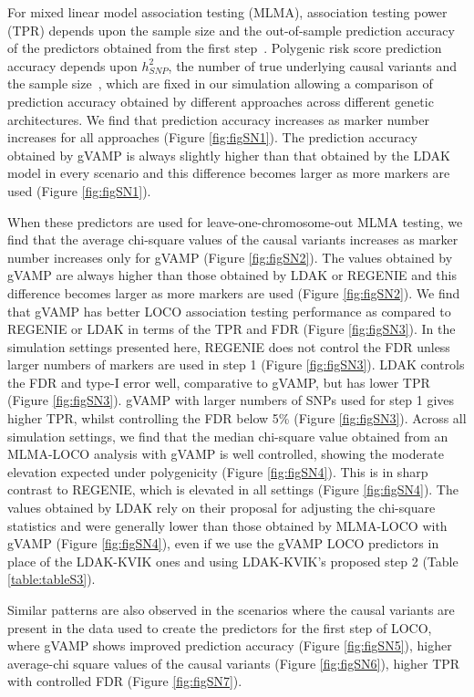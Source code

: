 For mixed linear model association testing (MLMA), association testing power (TPR) depends upon the sample size and the out-of-sample prediction accuracy of the predictors obtained from the first step~\cite{mlma}. Polygenic risk score prediction accuracy depends upon $h^{2}_{SNP}$, the number of true underlying causal variants and the sample size~\cite{daetwyler}, which are fixed in our simulation allowing a comparison of prediction accuracy obtained by different approaches across different genetic architectures. We find that prediction accuracy increases as marker number increases for all approaches (Figure \ref{fig:figSN1}). The prediction accuracy obtained by gVAMP is always slightly higher than that obtained by the LDAK model in every scenario and this difference becomes larger as more markers are used (Figure \ref{fig:figSN1}).

When these predictors are used for leave-one-chromosome-out MLMA testing, we find that the average chi-square values of the causal variants increases as marker number increases only for gVAMP (Figure \ref{fig:figSN2}). The values obtained by gVAMP are always higher than those obtained by LDAK or REGENIE and this difference becomes larger as more markers are used (Figure \ref{fig:figSN2}). We find that gVAMP has better LOCO association testing performance as compared to REGENIE or LDAK in terms of the TPR and FDR (Figure \ref{fig:figSN3}). In the simulation settings presented here, REGENIE does not control the FDR unless larger numbers of markers are used in step 1 (Figure \ref{fig:figSN3}). LDAK controls the FDR and type-I error well, comparative to gVAMP, but has lower TPR (Figure \ref{fig:figSN3}). gVAMP with larger numbers of SNPs used for step 1 gives higher TPR, whilst controlling the FDR below 5\% (Figure \ref{fig:figSN3}). Across all simulation settings, we find that the median chi-square value obtained from an MLMA-LOCO analysis with gVAMP is well controlled, showing the moderate elevation expected under polygenicity (Figure \ref{fig:figSN4}). This is in sharp contrast to REGENIE, which is elevated in all settings (Figure \ref{fig:figSN4}). The values obtained by LDAK rely on their proposal for adjusting the chi-square statistics and were generally lower than those obtained by MLMA-LOCO with gVAMP (Figure \ref{fig:figSN4}), even if we use the gVAMP LOCO predictors in place of the LDAK-KVIK ones and using LDAK-KVIK's proposed step 2 (Table \ref{table:tableS3}).

Similar patterns are also observed in the scenarios where the causal variants are present in the data used to create the predictors for the first step of LOCO, where gVAMP shows improved prediction accuracy (Figure \ref{fig:figSN5}), higher average-chi square values of the causal variants (Figure \ref{fig:figSN6}), higher TPR with controlled FDR (Figure \ref{fig:figSN7}). 

